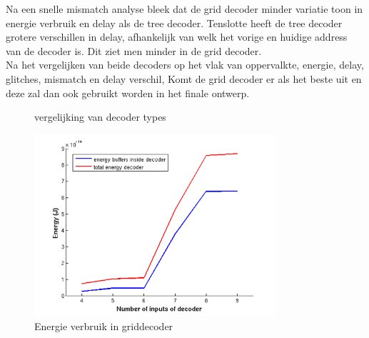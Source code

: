 Na een snelle mismatch analyse bleek dat de grid decoder minder variatie toon in energie verbruik en delay als de tree decoder. Tenslotte heeft de tree decoder grotere verschillen in delay, afhankelijk van welk het vorige en huidige address van de decoder is. Dit ziet men minder in de grid decoder. \\
Na het vergelijken van beide decoders op het vlak van oppervalkte, energie, delay, glitches, mismatch en delay verschil, Komt de grid decoder er als het beste uit en deze zal dan ook gebruikt worden in het finale ontwerp.


\begin{figure}[!ht]
\centering
{}
\caption{vergelijking van decoder types}
\end{figure}


\begin{figure}[!ht]
  \centering
  \includegraphics[width=0.8\textwidth]{../fig/hfdst-decoders-egrid.png}
  \caption{Energie verbruik in griddecoder}
  \label{fig:decoder_egrid}
\end{figure}

